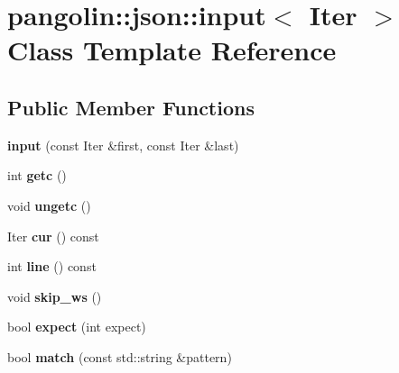 \hypertarget{classpangolin_1_1json_1_1input}{}\section{pangolin\+:\+:json\+:\+:input$<$ Iter $>$ Class Template Reference}
\label{classpangolin_1_1json_1_1input}
\subsection*{Public Member Functions}
\begin{DoxyCompactItemize}
\item 
{\bfseries input} (const Iter \&first, const Iter \&last)\hypertarget{classpangolin_1_1json_1_1input_a842ddc016079248aeb19b630f31674e0}{}\label{classpangolin_1_1json_1_1input_a842ddc016079248aeb19b630f31674e0}

\item 
int {\bfseries getc} ()\hypertarget{classpangolin_1_1json_1_1input_ad14af8ff8ef5dffaa5d9e039e60d3586}{}\label{classpangolin_1_1json_1_1input_ad14af8ff8ef5dffaa5d9e039e60d3586}

\item 
void {\bfseries ungetc} ()\hypertarget{classpangolin_1_1json_1_1input_a790d33d589614d6766325a82661c2c8c}{}\label{classpangolin_1_1json_1_1input_a790d33d589614d6766325a82661c2c8c}

\item 
Iter {\bfseries cur} () const \hypertarget{classpangolin_1_1json_1_1input_a83996aff4a9751cabbd55355a2f2506f}{}\label{classpangolin_1_1json_1_1input_a83996aff4a9751cabbd55355a2f2506f}

\item 
int {\bfseries line} () const \hypertarget{classpangolin_1_1json_1_1input_a0909f2bd0b1829c2c79a6c86c26f5d66}{}\label{classpangolin_1_1json_1_1input_a0909f2bd0b1829c2c79a6c86c26f5d66}

\item 
void {\bfseries skip\+\_\+ws} ()\hypertarget{classpangolin_1_1json_1_1input_a5f96bcc84bbfa4e5bc5132cd469b6913}{}\label{classpangolin_1_1json_1_1input_a5f96bcc84bbfa4e5bc5132cd469b6913}

\item 
bool {\bfseries expect} (int expect)\hypertarget{classpangolin_1_1json_1_1input_abb2dd067eea684f0504d1b018dff3a54}{}\label{classpangolin_1_1json_1_1input_abb2dd067eea684f0504d1b018dff3a54}

\item 
bool {\bfseries match} (const std\+::string \&pattern)\hypertarget{classpangolin_1_1json_1_1input_a88215cb203775294d1544784245fb28d}{}\label{classpangolin_1_1json_1_1input_a88215cb203775294d1544784245fb28d}

\end{DoxyCompactItemize}
